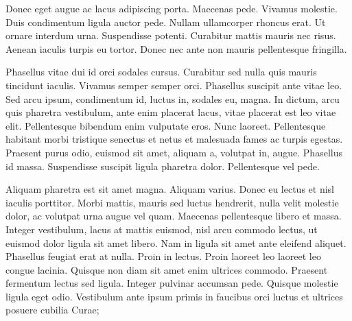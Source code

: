 Donec eget augue ac lacus adipiscing porta. Maecenas pede. Vivamus
molestie. Duis condimentum ligula auctor pede. Nullam ullamcorper
rhoncus erat. Ut ornare interdum urna. Suspendisse potenti.
Curabitur mattis mauris nec risus. Aenean iaculis turpis eu tortor.
Donec nec ante non mauris pellentesque fringilla.

Phasellus vitae dui id orci sodales cursus. Curabitur sed nulla quis
mauris tincidunt iaculis. Vivamus semper semper orci. Phasellus
suscipit ante vitae leo. Sed arcu ipsum, condimentum id, luctus in,
sodales eu, magna. In dictum, arcu quis pharetra vestibulum, ante
enim placerat lacus, vitae placerat est leo vitae elit. Pellentesque
bibendum enim vulputate eros. Nunc laoreet. Pellentesque habitant
morbi tristique senectus et netus et malesuada fames ac turpis
egestas. Praesent purus odio, euismod sit amet, aliquam a, volutpat
in, augue. Phasellus id massa. Suspendisse suscipit ligula pharetra
dolor. Pellentesque vel pede.

Aliquam pharetra est sit amet magna. Aliquam varius. Donec eu lectus
et nisl iaculis porttitor. Morbi mattis, mauris sed luctus
hendrerit, nulla velit molestie dolor, ac volutpat urna augue vel
quam. Maecenas pellentesque libero et massa. Integer vestibulum,
lacus at mattis euismod, nisl arcu commodo lectus, ut euismod dolor
ligula sit amet libero. Nam in ligula sit amet ante eleifend
aliquet. Phasellus feugiat erat at nulla. Proin in lectus. Proin
laoreet leo laoreet leo congue lacinia. Quisque non diam sit amet
enim ultrices commodo. Praesent fermentum lectus sed ligula. Integer
pulvinar accumsan pede. Quisque molestie ligula eget odio.
Vestibulum ante ipsum primis in faucibus orci luctus et ultrices
posuere cubilia Curae;
